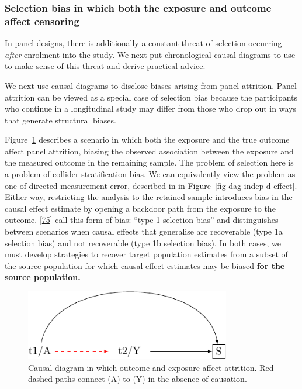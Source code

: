 \documentclass[
  singlecolumn]{article}
\begin{document}
\hypertarget{selection-bias-in-which-both-the-exposure-and-outcome-affect-censoring}{%
\subsubsection{Selection bias in which both the exposure and outcome
affect
censoring}\label{selection-bias-in-which-both-the-exposure-and-outcome-affect-censoring}}

In panel designs, there is additionally a constant threat of selection
occurring \emph{after} enrolment into the study. We next put
chronological causal diagrams to use to make sense of this threat and
derive practical advice.

We next use causal diagrams to disclose biases arising from panel
attrition. Panel attrition can be viewed as a special case of selection
bias because the participants who continue in a longitudinal study may
differ from those who drop out in ways that generate structural biases.

Figure~\ref{fig-dag-8-5} describes a scenario in which both the exposure
and the true outcome affect panel attrition, biasing the observed
association between the exposure and the measured outcome in the
remaining sample. The problem of selection here is a problem of collider
stratification bias. We can equivalently view the problem as one of
directed measurement error, described in in
Figure~\ref{fig-dag-indep-d-effect}. Either way, restricting the
analysis to the retained sample introduces bias in the causal effect
estimate by opening a backdoor path from the exposure to the outcome.
{[}\protect\hyperlink{ref-lu2022}{75}{]} call this form of bias: ``type
1 selection bias'' and distinguishes between scenarios when causal
effects that generalise are recoverable (type 1a selection bias) and not
recoverable (type 1b selection bias). In both cases, we must develop
strategies to recover target population estimates from a subset of the
source population for which causal effect estimates may be biased
\textbf{for the source population.}

\begin{figure}

{\centering \includegraphics[width=0.8\textwidth,height=\textheight]{causal-dags_files/figure-pdf/fig-dag-8-5-1.pdf}

}

\caption{\label{fig-dag-8-5}Causal diagram in which outcome and exposure
affect attrition. Red dashed paths connect (A) to (Y) in the absence of
causation.}

\end{figure}
\end{document}

